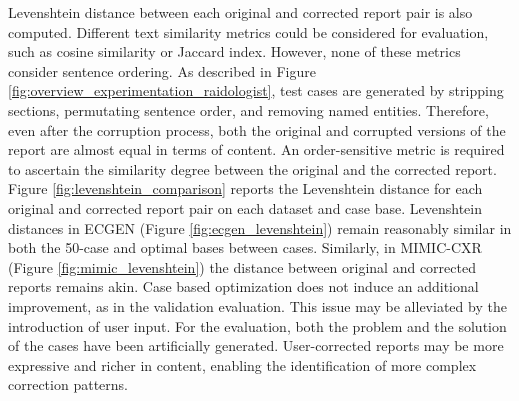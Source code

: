 Levenshtein distance \citep{levenshtein} between each original and corrected report pair is also computed. Different text similarity metrics could be considered for evaluation, such as cosine similarity or Jaccard index. However, none of these metrics consider sentence ordering. As described in Figure \ref{fig:overview_experimentation_raidologist}, test cases are generated by stripping sections, permutating sentence order, and removing named entities. Therefore, even after the corruption process, both the original and corrupted versions of the report are almost equal in terms of content. An order-sensitive metric is required to ascertain the similarity degree between the original and the corrected report. Figure \ref{fig:levenshtein_comparison} reports the Levenshtein distance for each original and corrected report pair on each dataset and case base. Levenshtein distances in ECGEN (Figure \ref{fig:ecgen_levenshtein}) remain reasonably similar in both the 50-case and optimal bases between cases. Similarly, in MIMIC-CXR (Figure \ref{fig:mimic_levenshtein}) the distance between original and corrected reports remains akin. Case based optimization does not induce an additional improvement, as in the validation evaluation. This issue may be alleviated by the introduction of user input. For the evaluation, both the problem and the solution of the cases have been artificially generated. User-corrected reports may be more expressive and richer in content, enabling the identification of more complex correction patterns.

